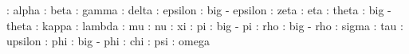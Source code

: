 \alpha : alpha
\beta : beta 
\gamma : gamma 
\delta : delta 
\epsilon : epsilon
\varepsilon : big - epsilon
\zeta: zeta
\eta: eta
\theta: theta 
\vartheta: big - theta 
\kappa : kappa 
\lambda : lambda 
\mu : mu 
\nu : nu 
\xi : xi 
\pi : pi 
\varpi : big - pi 
\rho : rho 
\varrho : big - rho 
\sigma : sigma 
\tau : tau 
\upsilon : upsilon 
\phi : phi 
\varphi : big - phi 
\chi : chi 
\psi : psi 
\omega : omega 